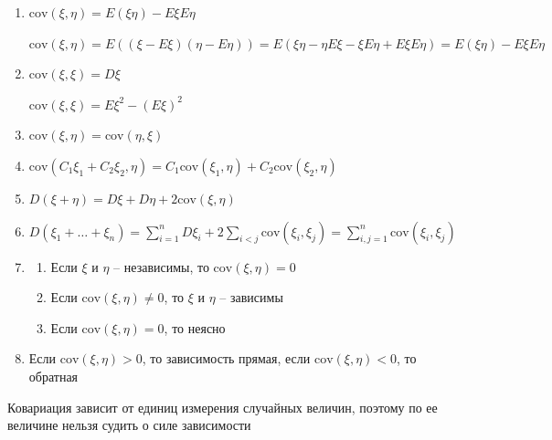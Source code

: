 \begin{enumerate}
    \item $\mathrm{cov} (\xi, \eta) = E(\xi\eta) - E\xi E\eta$

    \begin{MyProof}
        $\mathrm{cov}(\xi, \eta) = E((\xi - E\xi)(\eta - E\eta)) = E(\xi\eta - \eta E\xi - \xi E\eta + E\xi E\eta) = E(\xi\eta) - E\xi E\eta$
    \end{MyProof}

    \item $\mathrm{cov} (\xi, \xi) = D\xi$

    \begin{MyProof}
        $\mathrm{cov}(\xi, \xi) = E\xi^2 - (E\xi)^2$
    \end{MyProof}

    \item $\mathrm{cov}(\xi, \eta) = \mathrm{cov}(\eta, \xi)$

    \item $\mathrm{cov}(C_1 \xi_1 + C_2 \xi_2, \eta) = C_1 \mathrm{cov}(\xi_1, \eta) + C_2 \mathrm{cov}(\xi_2, \eta)$

    \item $D(\xi + \eta) = D\xi + D\eta + 2\mathrm{cov}(\xi, \eta)$

    \item $D(\xi_1 + \dots + \xi_n) = \sum_{i = 1}^n D\xi_i + 2\sum_{i < j} \mathrm{cov}(\xi_i, \xi_j) = \sum_{i, j = 1}^{n} \mathrm{cov}(\xi_i, \xi_j)$

    \item \begin{enumerate}
        \item Если $\xi$ и $\eta$ -- независимы, то $\mathrm{cov}(\xi, \eta) = 0$

        \item Если $\mathrm{cov}(\xi, \eta) \neq 0$, то $\xi$ и $\eta$ -- зависимы

        \item Если $\mathrm{cov}(\xi, \eta) = 0$, то неясно
    \end{enumerate}

    \item Если $\mathrm{cov}(\xi, \eta) > 0$, то зависимость прямая, если $\mathrm{cov}(\xi, \eta) < 0$, то обратная
\end{enumerate}

\Nota Ковариация зависит от единиц измерения случайных величин, поэтому по ее величине нельзя судить о силе зависимости

